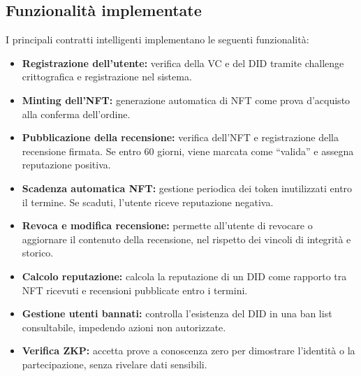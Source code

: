         \subsection{Funzionalità implementate}
            I principali contratti intelligenti implementano le seguenti funzionalità:
                \begin{itemize}
                    \item \textbf{Registrazione dell'utente:} verifica della VC e del DID tramite challenge crittografica e registrazione nel sistema.
                    
                    \item \textbf{Minting dell'NFT:} generazione automatica di NFT come prova d'acquisto alla conferma dell'ordine.
                
                    \item \textbf{Pubblicazione della recensione:} verifica dell'NFT e registrazione della recensione firmata. Se entro 60 giorni, viene marcata come “valida” e assegna reputazione positiva.
                
                    \item \textbf{Scadenza automatica NFT:} gestione periodica dei token inutilizzati entro il termine. Se scaduti, l'utente riceve reputazione negativa.
                
                    \item \textbf{Revoca e modifica recensione:} permette all'utente di revocare o aggiornare il contenuto della recensione, nel rispetto dei vincoli di integrità e storico.
                
                    \item \textbf{Calcolo reputazione:} calcola la reputazione di un DID come rapporto tra NFT ricevuti e recensioni pubblicate entro i termini.
                
                    \item \textbf{Gestione utenti bannati:} controlla l'esistenza del DID in una ban list consultabile, impedendo azioni non autorizzate.
                
                    \item \textbf{Verifica ZKP:} accetta prove a conoscenza zero per dimostrare l'identità o la partecipazione, senza rivelare dati sensibili.
                \end{itemize}

